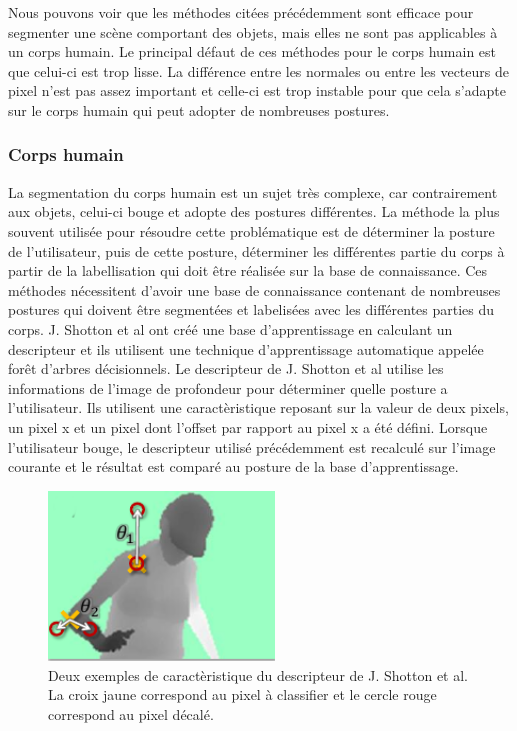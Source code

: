 Nous pouvons voir que les méthodes citées précédemment sont efficace pour segmenter une scène comportant des objets,
mais elles ne sont pas applicables à un corps humain. Le principal défaut de ces méthodes pour le corps humain est 
que celui-ci est trop lisse. La différence entre les normales ou entre les vecteurs de pixel n'est pas assez important
et celle-ci est trop instable pour que cela s'adapte sur le corps humain qui peut adopter de nombreuses postures.

\subsubsection{Corps humain}
La segmentation du corps humain est un sujet très complexe, car contrairement aux objets, celui-ci bouge et adopte
des postures différentes. La méthode la plus souvent utilisée pour résoudre cette problématique est de déterminer
la posture de l'utilisateur, puis de cette posture, déterminer les différentes partie du corps à partir de la labellisation
qui doit être réalisée sur la base de connaissance. 
Ces méthodes nécessitent d'avoir une base de connaissance contenant de nombreuses postures qui doivent
être segmentées et labelisées avec les différentes parties du corps. J. Shotton et al\cite{kinectSegmentation} ont
créé une base d'apprentissage en calculant un descripteur
et ils utilisent une technique d'apprentissage automatique appelée forêt d'arbres décisionnels\cite{randomDecisionForest}. 
Le descripteur de J. Shotton et al\cite{kinectSegmentation} utilise les informations de l'image de 
profondeur pour déterminer quelle posture a l'utilisateur. Ils utilisent une caractèristique reposant sur la valeur
de deux pixels, un pixel x et un pixel dont l'offset par rapport au pixel x a été défini.
Lorsque l'utilisateur bouge, le descripteur utilisé précédemment est recalculé sur l'image courante et le résultat 
est comparé au posture de la base d'apprentissage.\\

\begin{figure}[!ht]
  \begin{center}
    \includegraphics[width=6cm]{image/shotton.png}
    \caption{Deux exemples de caractèristique du descripteur de J. Shotton et al\cite{kinectSegmentation}. 
    La croix jaune correspond au pixel à classifier et le cercle rouge correspond au pixel décalé.}
  \end{center}
\end{figure}

